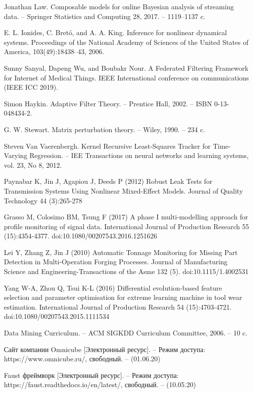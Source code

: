\begin{thebibliography}{00}
    Jonathan Law.
    Composable models for online Bayesian analysis of streaming data.
    -- Springer Statistics and Computing 28, 2017. -- 1119–1137 c.

    E. L. Ionides, C. Bretó, and A. A. King. 
    Inference for nonlinear dynamical systems.
    Proceedings of the National Academy of Sciences of the United States of America, 
    103(49):18438–43, 2006.

    Sunny Sanyal, Dapeng Wu, and Boubakr Nour.
    A Federated Filtering Framework for Internet of Medical Things.
    IEEE International conference on communications (IEEE ICC 2019).

    Simon Haykin.
    Adaptive Filter Theory. 
    -- Prentice Hall, 2002.
    -- ISBN 0-13-048434-2.

    G. W. Stewart. 
    Matrix perturbation theory. 
    -- Wiley, 1990. -- 234 c.

    Steven Van Vaerenbergh.
    Kernel Recursive Least-Squares Tracker
    for Time-Varying Regression.
    -- IEE Transactions on neural networks and learning systems, vol. 23, No 8, 2012.

    Paynabar K, Jin J, Agapiou J, Deeds P (2012) Robust Leak Tests for
    Transmission Systems Using Nonlinear Mixed-Effect Models. Journal of
    Quality Technology 44 (3):265-278

    Grasso M, Colosimo BM, Tsung F (2017) A phase I multi-modelling
    approach for profile monitoring of signal data. International Journal of
    Production
    Research
    55
    (15):4354-4377.
    doi:10.1080/00207543.2016.1251626

    Lei Y, Zhang Z, Jin J (2010) Automatic Tonnage Monitoring for Missing
    Part Detection in Multi-Operation Forging Processes. Journal of
    Manufacturing Science and Engineering-Transactions of the Asme 132
    (5). doi:10.1115/1.4002531

    Yang W-A, Zhou Q, Tsui K-L (2016) Differential evolution-based feature
    selection and parameter optimisation for extreme learning machine in tool
    wear estimation. International Journal of Production Research 54
    (15):4703-4721. doi:10.1080/00207543.2015.1111534

    Data Mining Curriculum.
    -- ACM SIGKDD Curriculum Committee, 2006. -- 10 c.

    Сайт компании Omnicube [Электронный ресурс].
    -- Режим доступа: https://www.omnicube.ru/, свободный. -- (01.06.20)

    Faust фреймворк [Электронный ресурс]. 
    -- Режим доступа: https://faust.readthedocs.io/en/latest/, свободный. -- (10.05.20)

\end{thebibliography}
\endgroup

\clearpage